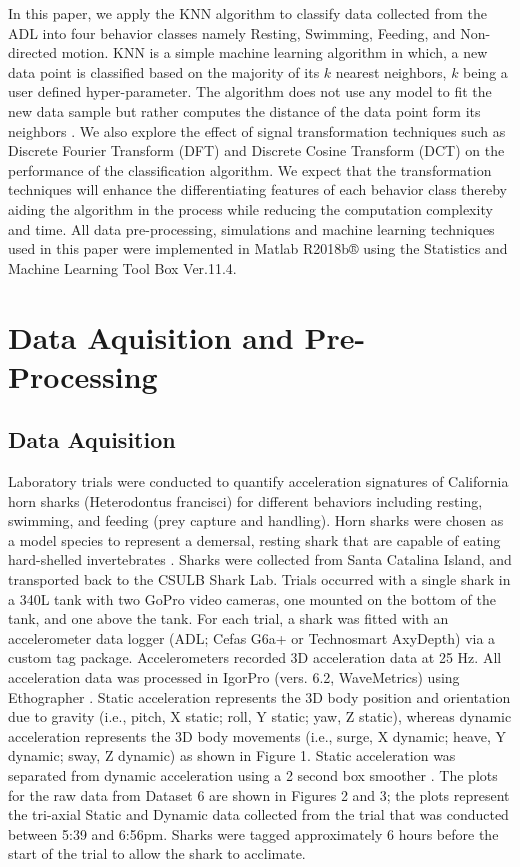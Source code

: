 \documentclass[conference]{IEEEtran}
\begin{document}
In this paper, we apply the KNN algorithm to classify data collected from the ADL into four behavior classes namely Resting, Swimming, Feeding, and Non-directed motion. KNN is a simple machine learning algorithm in which, a new data point is classified based on the majority of its $k$ nearest neighbors, $k$ being a user defined hyper-parameter. The algorithm does not use any model to fit the new data sample but rather computes the distance of the data point form its neighbors  \cite{7}. We also explore the effect of signal transformation techniques such as Discrete Fourier Transform (DFT) and Discrete Cosine Transform (DCT) on the performance of the classification algorithm. We expect that the transformation techniques will enhance the differentiating features of each behavior class thereby aiding the algorithm in the process while reducing the computation complexity and time. All data pre-processing, simulations and machine learning techniques used in this paper were implemented in Matlab R2018b® using the Statistics and Machine Learning Tool Box Ver.11.4.

\section{Data Aquisition and Pre-Processing}

\subsection{Data Aquisition}
Laboratory trials were conducted to quantify acceleration signatures of California horn sharks (Heterodontus francisci) for different behaviors including resting, swimming, and feeding (prey capture and handling). Horn sharks were chosen as a model species to represent a demersal, resting shark that are capable of eating hard-shelled invertebrates \cite{8, 9, 10}. Sharks were collected from Santa Catalina Island, and transported back to the CSULB Shark Lab. Trials occurred with a single shark in a 340L tank with two GoPro video cameras, one mounted on the bottom of the tank, and one above the tank. For each trial, a shark was fitted with an accelerometer data logger (ADL; Cefas G6a+ or Technosmart AxyDepth) via a custom tag package. Accelerometers recorded 3D acceleration data at 25 Hz. All acceleration data was processed in IgorPro (vers. 6.2, WaveMetrics) using Ethographer \cite{11}. Static acceleration represents the 3D body position and orientation due to gravity (i.e., pitch, X static; roll, Y static; yaw, Z static), whereas dynamic acceleration represents the 3D body movements (i.e., surge, X dynamic; heave, Y dynamic; sway, Z dynamic) as shown in Figure 1. Static acceleration was separated from dynamic acceleration using a 2 second box smoother \cite{12}. The plots for the raw data from Dataset 6 are shown in Figures 2 and 3; the plots represent the tri-axial Static and Dynamic data collected from the trial that was conducted between 5:39 and 6:56pm. Sharks were tagged approximately 6 hours before the start of the trial to allow the shark to acclimate. 
\end{document}
